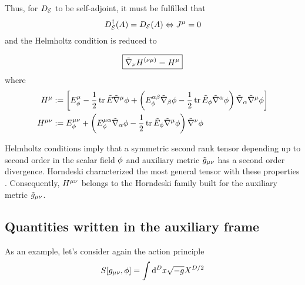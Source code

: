 Thus, for $D_{\mathcal{E}} $ to be self-adjoint, it must be fulfilled that
\begin{equation}
  D^\dagger _{\mathcal{E}} (A)=D_{\mathcal{E}} (A) \Leftrightarrow J^\mu =0
\end{equation}
and the Helmholtz condition is reduced to
\begin{tcolorbox}
\begin{equation}\label{Hemholtz-condition}
\boxed{  \tilde{\nabla}_\nu H^{(\nu\mu) }=H^\mu }
\end{equation}
where 
\begin{align}
  H^\mu &:=\left[E^\mu_\phi -\frac{1}{2}\tr\tilde{E}\tilde{\nabla}^\mu\phi +\left(E^{\alpha\beta }_\phi\tilde{\nabla}_\beta \phi -\frac{1}{2}\tr \tilde{E}_\phi\tilde{\nabla}^\alpha\phi \right)\tilde{\nabla}_\alpha\tilde{\nabla}^\mu\phi \right]\\
  H^{\mu\nu }&:=E^{\mu\nu }_\phi+\left(E^{\mu\alpha }_\phi \tilde{\nabla}_\alpha \phi-\frac{1}{2}\tr\tilde{E}_\phi\tilde{\nabla}^\mu\phi \right)\tilde{\nabla}^\nu\phi 
\end{align}
\end{tcolorbox}

Helmholtz conditions imply that a symmetric second rank tensor depending up to second order in the scalar field $\phi$ and auxiliary metric $\tilde{g}_{\mu\nu }$ has a second order divergence. Horndeski characterized the most general tensor with these properties \cite{Horndeski:1974wa}. Consequently, $H^{\mu\nu }$ belongs to the Horndeski family built for the auxiliary metric $\tilde{g}_{\mu\nu }$.

\subsection{Quantities written in the auxiliary frame}
As an example, let's consider again the action principle
\begin{equation}\label{S-auxiliar-frame}
  S[g_{\mu\nu },\phi ]=\int\dd^Dx\sqrt{-g}X^{D/2}
\end{equation}

